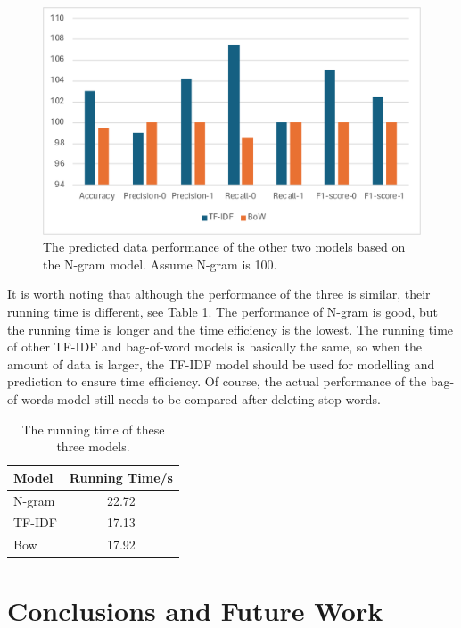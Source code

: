 \documentclass[11pt]{article}
\begin{document}
\begin{figure}[t]
  \includegraphics[width=\columnwidth]{figures/1.pdf}
  \caption{The predicted data performance of the other two models based on the N-gram model. Assume N-gram is 100.}
  \label{fig:ngram}
\end{figure}

It is worth noting that although the performance of the three is similar, their running time is different, see Table \ref{tab:time}. The performance of N-gram is good, but the running time is longer and the time efficiency is the lowest. The running time of other TF-IDF and bag-of-word models is basically the same, so when the amount of data is larger, the TF-IDF model should be used for modelling and prediction to ensure time efficiency. Of course, the actual performance of the bag-of-words model still needs to be compared after deleting stop words.

\begin{table}
  \centering
  \begin{tabular}{lc}
    \hline
    \textbf{Model} & \textbf{Running Time/s} \\
    \hline
    N-gram     & 22.72           \\
    TF-IDF     & 17.13           \\
    Bow     & 17.92          \\\hline
  \end{tabular}
  \caption{The running time of these three models.}
  \label{tab:time}
 \end{table}

\section{Conclusions and Future Work}
\end{document}
